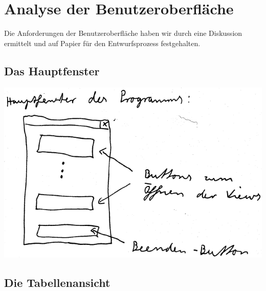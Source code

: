 \documentclass[11pt,a4paper]{scrreprt}
\begin{document}
\chapter{Analyse der Benutzeroberfl\"ache}
Die Anforderungen der Benutzeroberfl\"ache haben wir durch eine Diskussion
ermittelt und auf Papier f\"ur den Entwurfsprozess festgehalten.

\section{Das Hauptfenster}

\begin{center}
\includegraphics[width=14cm]{mainwindow.png}
\end{center}

\section{Die Tabellenansicht}
\end{document}
